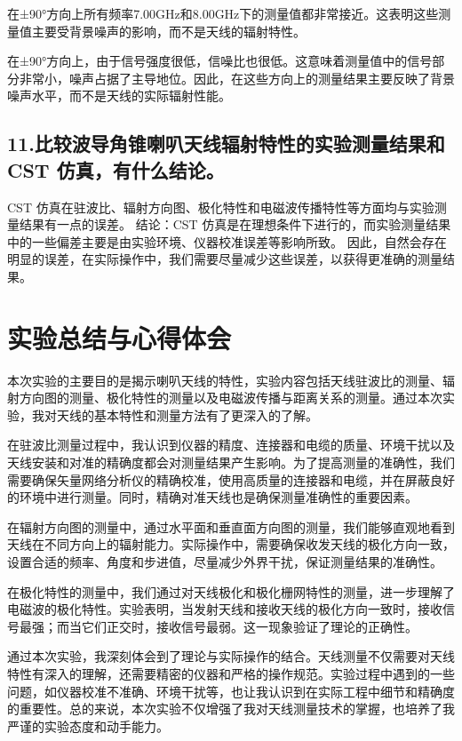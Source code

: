 \documentclass[12pt,hyperref,a4paper,UTF8]{ctexart}
\begin{document}
在±90°方向上所有频率7.00GHz和8.00GHz下的测量值都非常接近。这表明这些测量值主要受背景噪声的影响，而不是天线的辐射特性。

在±90°方向上，由于信号强度很低，信噪比也很低。这意味着测量值中的信号部分非常小，噪声占据了主导地位。因此，在这些方向上的测量结果主要反映了背景噪声水平，而不是天线的实际辐射性能。

\subsection*{11.比较波导角锥喇叭天线辐射特性的实验测量结果和 CST 仿真，有什么结论。}
CST 仿真在驻波比、辐射方向图、极化特性和电磁波传播特性等方面均与实验测量结果有一点的误差。
结论：CST 仿真是在理想条件下进行的，而实验测量结果中的一些偏差主要是由实验环境、仪器校准误差等影响所致。
因此，自然会存在明显的误差，在实际操作中，我们需要尽量减少这些误差，以获得更准确的测量结果。






\section{实验总结与心得体会}

本次实验的主要目的是揭示喇叭天线的特性，实验内容包括天线驻波比的测量、辐射方向图的测量、极化特性的测量以及电磁波传播与距离关系的测量。通过本次实验，我对天线的基本特性和测量方法有了更深入的了解。

在驻波比测量过程中，我认识到仪器的精度、连接器和电缆的质量、环境干扰以及天线安装和对准的精确度都会对测量结果产生影响。为了提高测量的准确性，我们需要确保矢量网络分析仪的精确校准，使用高质量的连接器和电缆，并在屏蔽良好的环境中进行测量。同时，精确对准天线也是确保测量准确性的重要因素。

在辐射方向图的测量中，通过水平面和垂直面方向图的测量，我们能够直观地看到天线在不同方向上的辐射能力。实际操作中，需要确保收发天线的极化方向一致，设置合适的频率、角度和步进值，尽量减少外界干扰，保证测量结果的准确性。

在极化特性的测量中，我们通过对天线极化和极化栅网特性的测量，进一步理解了电磁波的极化特性。实验表明，当发射天线和接收天线的极化方向一致时，接收信号最强；而当它们正交时，接收信号最弱。这一现象验证了理论的正确性。

通过本次实验，我深刻体会到了理论与实际操作的结合。天线测量不仅需要对天线特性有深入的理解，还需要精密的仪器和严格的操作规范。实验过程中遇到的一些问题，如仪器校准不准确、环境干扰等，也让我认识到在实际工程中细节和精确度的重要性。总的来说，本次实验不仅增强了我对天线测量技术的掌握，也培养了我严谨的实验态度和动手能力。
\end{document}
